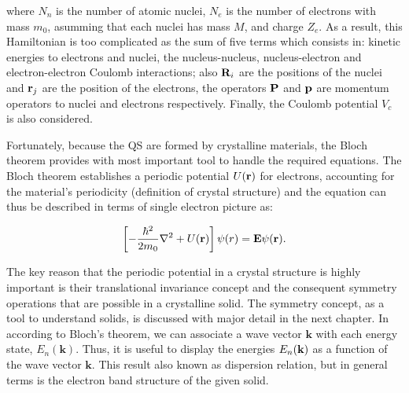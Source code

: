 where  $N_{n}$ is the number of atomic nuclei, $N_{e}$ is the number of electrons with mass $m_{0}$, asumming that each nuclei has mass $M$, and charge $Z_{e}$. As a result, this Hamiltonian is too complicated as the sum of five terms which consists in: kinetic energies to electrons and nuclei, the nucleus-nucleus, nucleus-electron and electron-electron Coulomb interactions; also $\mathrm{\bf R}_{i}$ are the positions of the nuclei and $\mathrm{\bf r}_{j}$ are the position of the electrons, the operators $\mathrm{\bf P}$ and $\mathrm{\bf p}$ are momentum operators to nuclei and electrons respectively.  Finally, the Coulomb potential $V_{c}$\cite{alloul2010introduction} is also considered.  

Fortunately, because  the QS are formed by crystalline materials, the Bloch theorem provides with most important tool to handle the required equations. The Bloch theorem establishes a periodic potential $U(\displaystyle\mathrm{\bf r})$ for electrons, accounting for the material's periodicity (definition of crystal structure) and the \sch equation can thus be described in terms of single electron picture as:  


\begin{equation}
	\left[-\dfrac{\hbar^2}{2m_{0}}\nabla^2 + U(\displaystyle\mathrm{\bf r})\right]\psi (r)=\displaystyle\mathrm{\bf E}\psi(\displaystyle\mathrm{\bf r}).
	\label{eq:chapter-1-first-sch}
\end{equation}

The key reason that the periodic potential in a crystal structure is highly important is their translational invariance concept and the consequent symmetry operations that are possible in a crystalline solid. The symmetry concept, as a  tool to understand solids, is discussed with major detail in the next chapter. In according to Bloch's theorem, we can associate a wave vector $\boldsymbol{k}$ with each energy state, $E_{n}(\boldsymbol{k})$. Thus, it is useful to display the energies $E_{n}(\bf{k})$ as a function of the wave vector $\boldsymbol{k}$. This result also known as dispersion relation, but in general terms is the electron band structure of the given solid\cite{piprek2017handbook}.   

